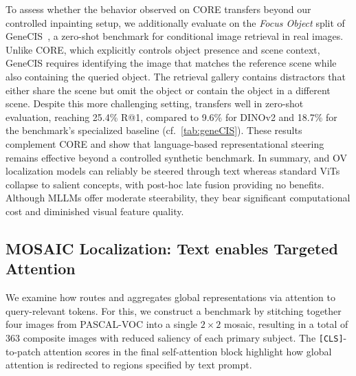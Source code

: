 To assess whether the behavior observed on CORE transfers beyond our controlled inpainting setup, we additionally evaluate on the \textit{Focus Object} split of GeneCIS~\cite{vaze2023gen}, a zero-shot benchmark for conditional image retrieval in real images. Unlike CORE, which explicitly controls object presence and scene context, GeneCIS requires identifying the image that matches the reference scene while also containing the queried object. The retrieval gallery contains distractors that either share the scene but omit the object or contain the object in a different scene. Despite this more challenging setting, \model{} transfers well in zero-shot evaluation, reaching 25.4\% R@1, compared to 9.6\% for DINOv2 and 18.7\% for the benchmark’s specialized baseline (cf.~\cref{tab:geneCIS}). These results complement CORE and show that language-based representational steering remains effective beyond a controlled synthetic benchmark.
\newline\newline
In summary, \model{} and OV localization models can reliably be steered through text whereas standard ViTs collapse to salient concepts, with post-hoc late fusion providing no benefits. Although MLLMs offer moderate steerability, they bear significant computational cost and diminished visual feature quality. 

\subsection{MOSAIC Localization: Text enables Targeted Attention}
\label{subsec:mosaic_exp}


We examine how \model{} routes and aggregates global representations via attention to query-relevant tokens.
For this, we construct a benchmark by stitching together four images from PASCAL-VOC \cite{pascal_voc} into a single $2\times2$ mosaic, resulting in a total of 363 composite images with reduced saliency of each primary subject.
The \texttt{[CLS]}-to-patch attention scores in the final self-attention block highlight how global attention is redirected to regions specified by text prompt. 

